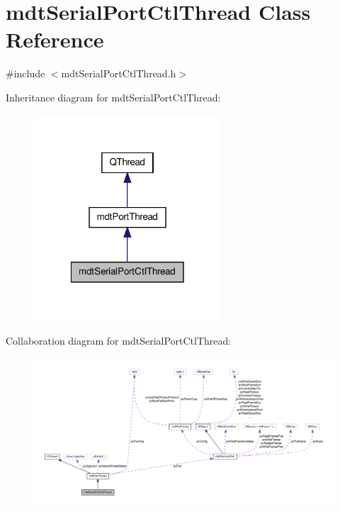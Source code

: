 \hypertarget{classmdt_serial_port_ctl_thread}{\section{mdt\-Serial\-Port\-Ctl\-Thread Class Reference}
\label{classmdt_serial_port_ctl_thread}
}


{\ttfamily \#include $<$mdt\-Serial\-Port\-Ctl\-Thread.\-h$>$}



Inheritance diagram for mdt\-Serial\-Port\-Ctl\-Thread\-:
\nopagebreak
\begin{figure}[H]
\begin{center}
\leavevmode
\includegraphics[width=198pt]{classmdt_serial_port_ctl_thread__inherit__graph}
\end{center}
\end{figure}


Collaboration diagram for mdt\-Serial\-Port\-Ctl\-Thread\-:
\nopagebreak
\begin{figure}[H]
\begin{center}
\leavevmode
\includegraphics[width=350pt]{classmdt_serial_port_ctl_thread__coll__graph}
\end{center}
\end{figure}
